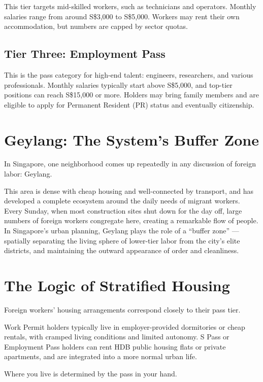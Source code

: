 This tier targets mid-skilled workers, such as technicians and operators. Monthly salaries range from around S\$3,000 to S\$5,000. Workers may rent their own accommodation, but numbers are capped by sector quotas.

\subsection*{Tier Three: Employment Pass}

This is the pass category for high-end talent: engineers, researchers, and various professionals. Monthly salaries typically start above S\$5,000, and top-tier positions can reach S\$15,000 or more. Holders may bring family members and are eligible to apply for Permanent Resident (PR) status and eventually citizenship.

\section{Geylang: The System's Buffer Zone}

In Singapore, one neighborhood comes up repeatedly in any discussion of foreign labor: Geylang.

This area is dense with cheap housing and well-connected by transport, and has developed a complete ecosystem around the daily needs of migrant workers. Every Sunday, when most construction sites shut down for the day off, large numbers of foreign workers congregate here, creating a remarkable flow of people. In Singapore's urban planning, Geylang plays the role of a ``buffer zone'' --- spatially separating the living sphere of lower-tier labor from the city's elite districts, and maintaining the outward appearance of order and cleanliness.

\section{The Logic of Stratified Housing}

Foreign workers' housing arrangements correspond closely to their pass tier.

Work Permit holders typically live in employer-provided dormitories or cheap rentals, with cramped living conditions and limited autonomy. S Pass or Employment Pass holders can rent HDB public housing flats or private apartments, and are integrated into a more normal urban life.

Where you live is determined by the pass in your hand.

